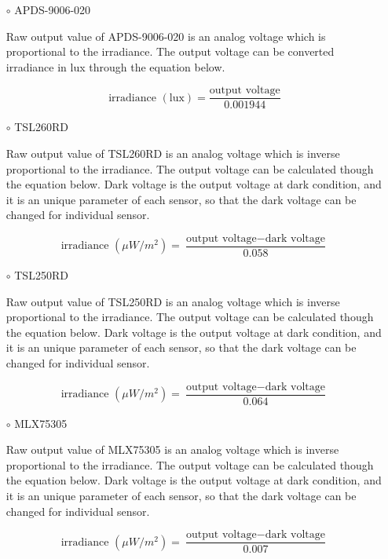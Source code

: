 \begin{itemize}
\item[$\circ$] APDS-9006-020

Raw output value of APDS-9006-020 is an analog voltage which is proportional to the irradiance. The output voltage can be converted irradiance in lux through the equation below.

\bigbreak

{\centering
 \[ \text{irradiance } (\text{lux}) = \frac{\text{output voltage}}{0.001944} \]
 \par
 }

 
\item[$\circ$] TSL260RD

Raw output value of TSL260RD is an analog voltage which is inverse proportional to the irradiance. The output voltage can be calculated though the equation below.
Dark voltage is the output voltage at dark condition, and it is an unique parameter of each sensor, so that the dark voltage can be changed for individual sensor.

\bigbreak

{\centering
 \[ \text{irradiance } (\mu W/m^2) = \frac{\text{output voltage} - \text{dark voltage}}{0.058} \]
 \par
 }


\item[$\circ$] TSL250RD

Raw output value of TSL250RD is an analog voltage which is inverse proportional to the irradiance. The output voltage can be calculated though the equation below.
Dark voltage is the output voltage at dark condition, and it is an unique parameter of each sensor, so that the dark voltage can be changed for individual sensor.

\bigbreak

{\centering
 \[ \text{irradiance } (\mu W/m^2) = \frac{\text{output voltage} - \text{dark voltage}}{0.064} \]
 \par
 }
 

\item[$\circ$] MLX75305

Raw output value of MLX75305 is an analog voltage which is inverse proportional to the irradiance. The output voltage can be calculated though the equation below.
Dark voltage is the output voltage at dark condition, and it is an unique parameter of each sensor, so that the dark voltage can be changed for individual sensor.

\bigbreak

{\centering
 \[ \text{irradiance } (\mu W/m^2) = \frac{\text{output voltage} - \text{dark voltage}}{0.007} \]
 \par
 }
 


\end{itemize}
